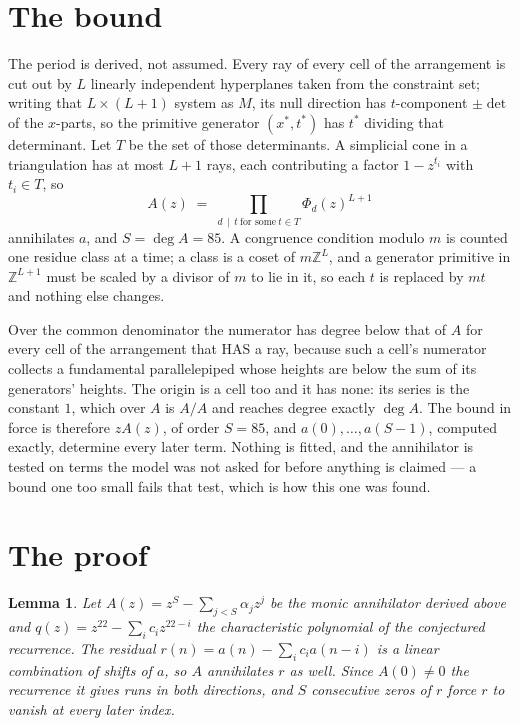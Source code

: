 \documentclass[11pt,a4paper]{article}
\theoremstyle{plain}
\newtheorem{lemma}[theorem]{Lemma}
\theoremstyle{definition}
\begin{document}
\section{The bound}

The period is derived, not assumed. Every ray of every cell of the arrangement is cut out by
$L$ linearly independent hyperplanes taken from the constraint set; writing that $L\times(L+1)$
system as $M$, its null direction has $t$-component $\pm\det$ of the $x$-parts, so the
primitive generator $(x^*,t^*)$ has $t^*$ dividing that determinant. Let $T$ be the set of
those determinants. A simplicial cone in a triangulation has at most $L+1$ rays, each
contributing a factor $1-z^{t_i}$ with $t_i\in T$, so
\[
A(z)\;=\;\prod_{d\,\mid\,t\ \text{for some}\ t\in T}\Phi_d(z)^{L+1}
\]
annihilates $a$, and $S=\deg A=85$. A congruence condition modulo $m$ is counted one residue
class at a time; a class is a coset of $m\mathbb{Z}^L$, and a generator primitive in
$\mathbb{Z}^{L+1}$ must be scaled by a divisor of $m$ to lie in it, so each $t$ is replaced
by $mt$ and nothing else changes.

Over the common denominator the numerator has degree below that of $A$ for every cell of the
arrangement that HAS a ray, because such a cell's numerator collects a fundamental
parallelepiped whose heights are below the sum of its generators' heights. The origin is a cell
too and it has none: its series is the constant $1$, which over $A$ is $A/A$ and reaches degree
exactly $\deg A$. The bound in force is therefore $zA(z)$, of order $S=85$, and
$a(0),\dots,a(S-1)$, computed exactly, determine every later term. Nothing is fitted, and the
annihilator is tested on terms the model was not asked for before anything is claimed --- a
bound one too small fails that test, which is how this one was found.

\section{The proof}

\begin{lemma}\label{lem:crit}
Let $A(z)=z^S-\sum_{j<S}\alpha_jz^{j}$ be the monic annihilator derived above and
$q(z)=z^{22}-\sum_ic_iz^{22-i}$ the characteristic polynomial of the conjectured
recurrence. The residual $r(n)=a(n)-\sum_ic_ia(n-i)$ is a linear combination of shifts of $a$,
so $A$ annihilates $r$ as well. Since $A(0)\ne0$ the recurrence it gives runs in both
directions, and $S$ consecutive zeros of $r$ force $r$ to vanish at every later index.
\end{lemma}
\end{document}
